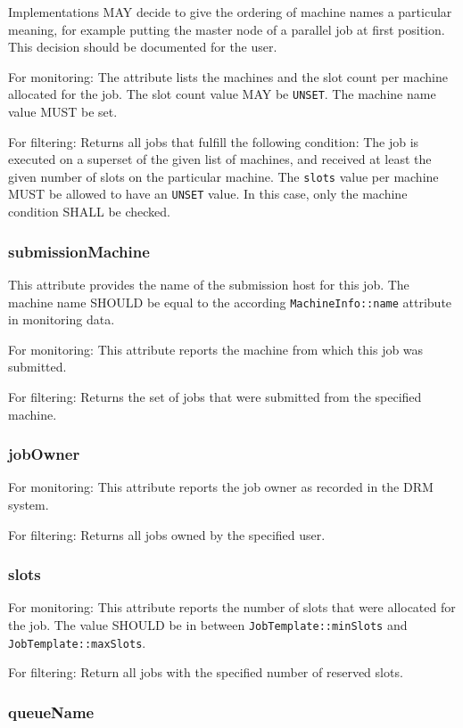 \documentclass{article}
\newcommand{\h}[1]{\lstinline|#1|}
\begin{document}
Implementations MAY decide to give the ordering of machine names a particular meaning, for example putting the master node of a parallel job at first position. This decision should be documented for the user. 

For monitoring: The attribute lists the machines and the slot count per machine allocated for the job. The slot count value MAY be \h{UNSET}. The machine name value MUST be set.

For filtering: Returns all jobs that fulfill the following condition: The job is executed on a superset of the given list of machines, and received at least the given number of slots on the particular machine. The \h{slots} value per machine MUST be allowed to have an \h{UNSET} value. In this case, only the machine condition SHALL be checked.

\subsubsection{submissionMachine}

This attribute provides the name of the submission host for this job. The machine name SHOULD be equal to the according \h{MachineInfo::name} attribute in monitoring data.

For monitoring: This attribute reports the machine from which this job was submitted.

For filtering: Returns the set of jobs that were submitted from the specified machine.

\subsubsection{jobOwner}

For monitoring: This attribute reports the job owner as recorded in the DRM system.

For filtering: Returns all jobs owned by the specified user.

\subsubsection{slots}

For monitoring: This attribute reports the number of slots that were allocated for the job. The value SHOULD be in between \h{JobTemplate::minSlots} and \h{JobTemplate::maxSlots}.

For filtering: Return all jobs with the specified number of reserved slots.

\subsubsection{queueName}
\end{document}
